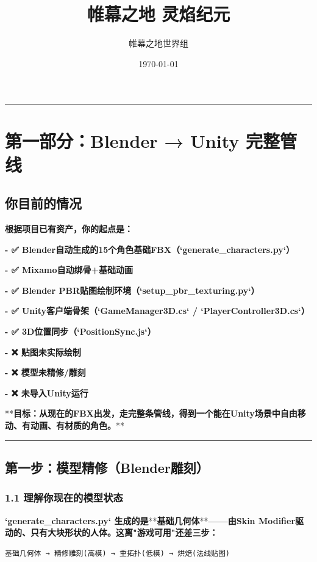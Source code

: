 \documentclass[12pt,a4paper,openany]{ctexbook}
\begin{document}
\title{帷幕之地 \cdot 灵焰纪元}
\author{帷幕之地世界组}
\date{\today}
\maketitle
\tableofcontents
\newpage


\bigskip\hrule\bigskip


\chapter{第一部分：Blender → Unity 完整管线}


\section*{你目前的情况}


\textbf{根据项目已有资产，你的起点是：}

\textbf{- ✅ Blender自动生成的15个角色基础FBX（`generate\_characters.py`）}

\textbf{- ✅ Mixamo自动绑骨+基础动画}

\textbf{- ✅ Blender PBR贴图绘制环境（`setup\_pbr\_texturing.py`）}

\textbf{- ✅ Unity客户端骨架（`GameManager3D.cs` / `PlayerController3D.cs`）}

\textbf{- ✅ 3D位置同步（`PositionSync.js`）}

\textbf{- ❌ 贴图未实际绘制}

\textbf{- ❌ 模型未精修/雕刻}

\textbf{- ❌ 未导入Unity运行}


**\textbf{目标：从现在的FBX出发，走完整条管线，得到一个能在Unity场景中自由移动、有动画、有材质的角色。}**


\bigskip\hrule\bigskip


\section*{第一步：模型精修（Blender雕刻）}


\subsection*{1.1 理解你现在的模型状态}


\textbf{`generate\_characters.py` 生成的是}**\textbf{基础几何体}**\textbf{——由Skin Modifier驱动的、只有大块形状的人体。这离"游戏可用"还差三步：}


\begin{verbatim}
基础几何体 → 精修雕刻(高模) → 重拓扑(低模) → 烘焙(法线贴图)
\end{verbatim}
\end{document}
